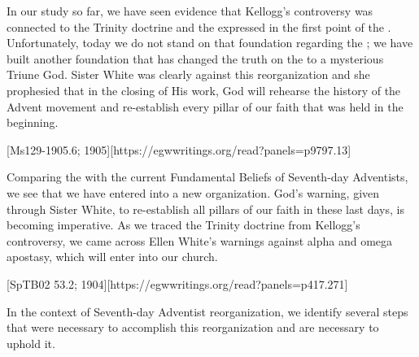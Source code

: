 
In our study so far, we have seen evidence that Kellogg’s controversy was connected to the Trinity doctrine and the  expressed in the first point of the . Unfortunately, today we do not stand on that foundation regarding the ; we have built another foundation that has changed the truth on the  to a mysterious Triune God. Sister White was clearly against this reorganization and she prophesied that in the closing of His work, God will rehearse the history of the Advent movement and re-establish every pillar of our faith that was held in the beginning.

[Ms129-1905.6; 1905][https://egwwritings.org/read?panels=p9797.13]

Comparing the  with the current Fundamental Beliefs of Seventh-day Adventists, we see that we have entered into a new organization. God’s warning, given through Sister White, to re-establish all pillars of our faith in these last days, is becoming imperative. As we traced the Trinity doctrine from Kellogg's controversy, we came across Ellen White’s warnings against alpha and omega apostasy, which will enter into our church.

[SpTB02 53.2; 1904][https://egwwritings.org/read?panels=p417.271]

In the context of Seventh-day Adventist reorganization, we identify several steps that were necessary to accomplish this reorganization and are necessary to uphold it. 

